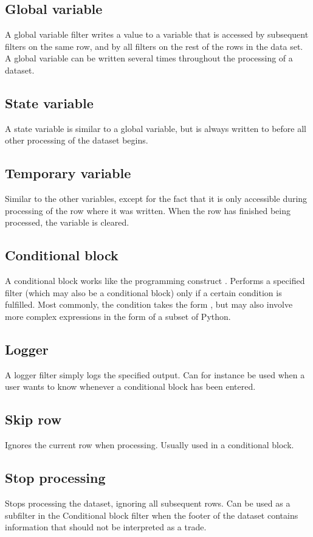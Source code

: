 \subsection{Global variable}
A global variable filter writes a value to a variable that is accessed by subsequent filters on the same row, and by all filters on the rest of the rows in the data
set. A global variable can be written several times throughout the processing of a dataset.

\subsection{State variable}
A state variable is similar to a global variable, but is always written to before all other processing of the dataset begins.

\subsection{Temporary variable}
Similar to the other variables, except for the fact that it is only accessible during processing of the row where it was written. When the row has finished being
processed, the variable is cleared.

\subsection{Conditional block}
A conditional block works like the programming construct . Performs a specified filter (which may also be a conditional block) only if a certain
condition is fulfilled. Most commonly, the condition takes the form , but may also involve more complex expressions in the form of a
subset of Python.

\subsection{Logger}
A logger filter simply logs the specified output. Can for instance be used when a user wants to know whenever a conditional block has been entered.

\subsection{Skip row}
Ignores the current row when processing. Usually used in a conditional block.

\subsection{Stop processing}
Stops processing the dataset, ignoring all subsequent rows. Can be used as a subfilter in the Conditional block filter when the footer of the dataset
contains information that should not be interpreted as a trade.

